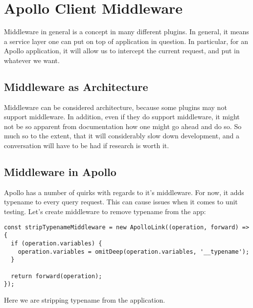 \maketitle{}
\section{ Apollo Client Middleware }

Middleware in general is a concept in many different plugins. In general, it
means a service layer one can put on top of application in question. In
particular, for an Apollo application, it will allow us to intercept the
current request, and put in whatever we want.

\subsection{ Middleware as Architecture }
Middleware can be considered architecture, because some plugins may not support
middleware. In addition, even if they do support middleware, it might not be so
apparent from documentation how one might go ahead and do so. So much so to the
extent, that it will considerably slow down development, and a conversation will
have to be had if research is worth it.

\subsection{ Middleware in Apollo }
Apollo has a number of quirks with regards to it's middleware. For now, it adds
typename to every query request. This can cause issues when it comes to unit
testing. Let's create middleware to remove typename from the app:
\begin{lstlisting}
const stripTypenameMiddleware = new ApolloLink((operation, forward) => {
  if (operation.variables) {
    operation.variables = omitDeep(operation.variables, '__typename');
  }

  return forward(operation);
});
\end{lstlisting}

Here we are stripping typename from the application. 

